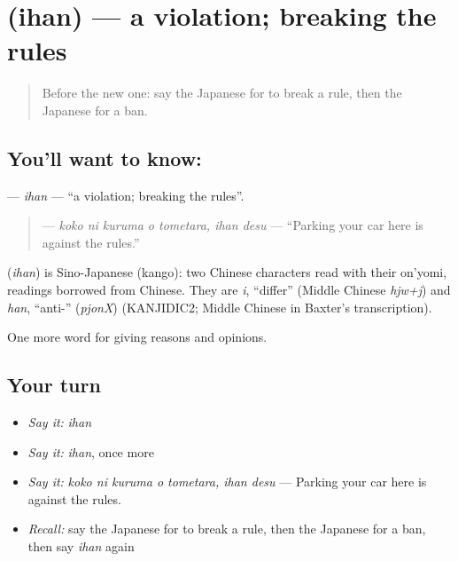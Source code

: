 \section[\texorpdfstring{\ja{いはん} (ihan)}{いはん (ihan)}]{ (ihan) — a violation; breaking the rules}

\label{lesson:JA-C326-ihan}



\begin{quote}
Before the new one: say the Japanese for to break a rule, then the Japanese for a ban.
\end{quote}

\subsection*{You'll want to know: }
\textbf{} — \emph{ihan} — \textquotedblleft{}a violation; breaking the rules\textquotedblright{}.

\begin{quote}
\textbf{  } — \emph{koko ni kuruma o tometara, ihan desu} — \textquotedblleft{}Parking your car here is against the rules.\textquotedblright{}
\end{quote}

\begin{cousinweb}
\textbf{} (\emph{ihan}) is Sino-Japanese (kango): two Chinese characters read with their on'yomi, readings borrowed from Chinese. They are \emph{i}, \textquotedblleft{}differ\textquotedblright{} (Middle Chinese \emph{hjw+j}) and \emph{han}, \textquotedblleft{}anti-\textquotedblright{} (\emph{pjonX}) (KANJIDIC2; Middle Chinese in Baxter's transcription).
\end{cousinweb}

\begin{grammarlens}[title={What you've built}]
One more word for giving reasons and opinions.
\end{grammarlens}

\subsection*{Your turn}
\begin{itemize}
\raggedright
  \item \emph{Say it:} \emph{ihan}
  \item \emph{Say it:} \emph{ihan}, once more
  \item \emph{Say it:} \emph{koko ni kuruma o tometara, ihan desu} — Parking your car here is against the rules.
  \item \emph{Recall:} say the Japanese for to break a rule, then the Japanese for a ban, then say \emph{ihan} again
\end{itemize}

